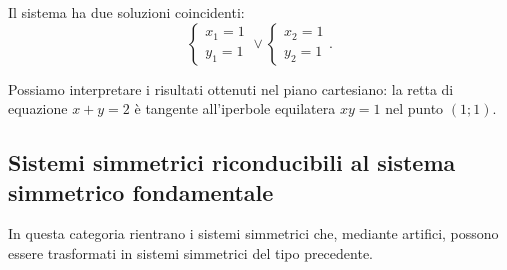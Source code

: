 \begin{exrig}
\begin{esempio}
\begin{multicols}{2}
Il sistema ha due soluzioni coincidenti: \[ \left\{\begin{array}{l}{x_1=1}\\{y_1=1}\end{array}\right.\vee \left\{\begin{array}{l}{x_2=1}\\{y_2=1}\end{array}\right.. \]

Possiamo interpretare i risultati ottenuti nel piano cartesiano: la retta di equazione \(x+y=2\) è tangente all'iperbole equilatera \(xy=1\) nel punto \((1;1)\).
\begin{center}

\end{center}
\end{multicols}
\end{esempio}
\end{exrig}
\ovalbox{\risolvii \ref{ese:6.14}, \ref{ese:6.15}, \ref{ese:6.16}, \ref{ese:6.17}, \ref{ese:6.18}, \ref{ese:6.19}}

\subsection{Sistemi simmetrici riconducibili al sistema simmetrico fondamentale}
In questa categoria rientrano i sistemi simmetrici che, mediante artifici, possono essere trasformati in sistemi simmetrici del tipo precedente.

